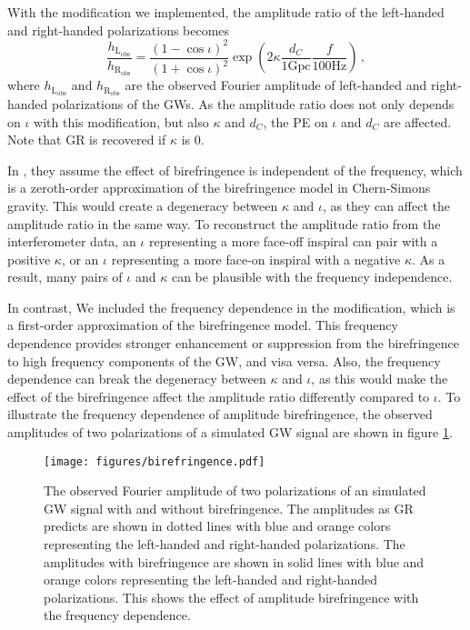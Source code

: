 \documentclass[aps,prd,twocolumn,superscriptaddress,preprintnumbers,floatfix,nofootinbib]{revtex4-2}
\begin{document}
With the modification we implemented, the amplitude ratio of the left-handed and right-handed polarizations becomes 
\begin{equation}
    \frac{h_\mathrm{L_{obs}}}{h_\mathrm{R_{obs}}}=\frac{\left(1-\cos\iota\right)^2}{\left(1+\cos\iota\right)^2}\exp\left({2\kappa\frac{d_C}{1\mathrm{Gpc}}\frac{f}{100\mathrm{Hz}}}\right)\,,
\end{equation}
where $h_\mathrm{L_{obs}}$ and $h_\mathrm{R_{obs}}$ are the observed Fourier amplitude of left-handed and right-handed polarizations of the GWs.
As the amplitude ratio does not only depends on $\iota$ with this modification, but also $\kappa$ and $d_C$, the PE on $\iota$ and $d_C$ are affected. Note that GR is recovered if $\kappa$ is $0$.

In \citet{Okounkova_2022}, they assume the effect of birefringence is independent of the frequency, which is a zeroth-order approximation of the birefringence model in Chern-Simons gravity.
This would create a degeneracy between $\kappa$ and $\iota$, as they can affect the amplitude ratio in the same way.
To reconstruct the amplitude ratio from the interferometer data, an $\iota$ representing a more face-off inspiral can pair with a positive $\kappa$, or an $\iota$ representing a more face-on inspiral with a negative $\kappa$.
As a result, many pairs of $\iota$ and $\kappa$ can be plausible with the frequency independence.

In contrast, We included the frequency dependence in the modification, which is a first-order approximation of the birefringence model.
    This frequency dependence provides stronger enhancement or suppression from the birefringence to high frequency components of the GW, and visa versa.
Also, the frequency dependence can break the degeneracy between $\kappa$ and $\iota$, as this would make the effect of the birefringence affect the amplitude ratio differently compared to $\iota$.
To illustrate the frequency dependence of amplitude birefringence, the observed amplitudes of two polarizations of a simulated GW signal are shown in figure \ref{fig:birefringence}.

\begin{figure}[h]
    \texttt{[image: figures/birefringence.pdf]}
    \caption{
        The observed Fourier amplitude of two polarizations of an simulated GW signal with and without birefringence.
        The amplitudes as GR predicts are shown in dotted lines with blue and orange colors representing the left-handed and right-handed polarizations.
        The amplitudes with birefringence are shown in solid lines with blue and orange colors representing the left-handed and right-handed polarizations.
        This shows the effect of amplitude birefringence with the frequency dependence.
    }
    \label{fig:birefringence}
\end{figure}
\end{document}
